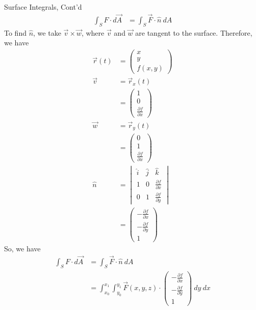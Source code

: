 \documentclass[8pt]{extarticle}
\begin{document}
  \begin{problem}{Surface Integrals, Cont'd}
    \begin{align*}
      \int_{S} F\cdot d\vec{A} &= \int_{S} \vec{F} \cdot \hat{n}~dA
    \end{align*}
    To find $\hat{n}$, we take $\vec{v} \times \vec{w}$, where $\vec{v}$ and $\vec{w}$ are tangent to the surface. Therefore, we have
    \begin{align*}
      \vec{r}(t) &= \begin{pmatrix}x\\y\\f(x,y)\end{pmatrix}\\
      \vec{v} &= \vec{r}_{x}(t)\\
              &= \begin{pmatrix}1\\0\\\frac{\partial f}{\partial x}\end{pmatrix}\\
      \vec{w} &= \vec{r}_{y}(t)\\
              &= \begin{pmatrix}0\\1\\\frac{\partial f}{\partial x}\end{pmatrix}\\
      \hat{n} &= \begin{vmatrix}\hat{i} & \hat{j} & \hat{k} \\ 1 & 0 & \frac{\partial f}{\partial x}\\ 0 & 1 & \frac{\partial f}{\partial y}\end{vmatrix}\\
              &= \begin{pmatrix}-\frac{\partial f}{\partial x} \\ -\frac{\partial f}{\partial y} \\ 1\end{pmatrix}
    \end{align*}
    So, we have
    \begin{align*}
      \int_{S} F\cdot d\vec{A} &= \int_{S} \vec{F} \cdot \hat{n}~dA\\
                               &= \int_{x_0}^{x_1}\int_{y_0}^{y_1} \vec{F}(x,y,z) \cdot\begin{pmatrix}-\frac{\partial f}{\partial x} \\ -\frac{\partial f}{\partial y} \\ 1\end{pmatrix}~dy~dx

\end{align*}
\end{problem}
\end{document}
